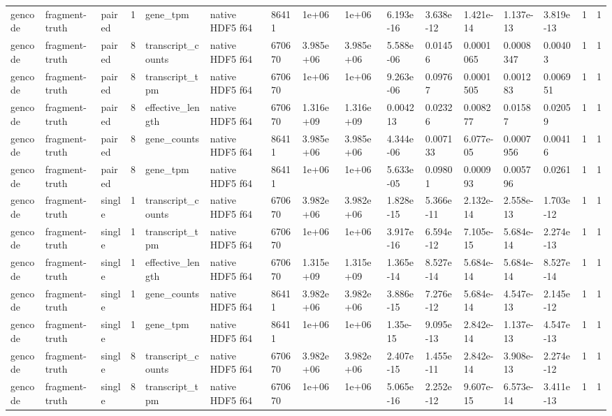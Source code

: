 \begin{tabular}{llllllllllllllll}
gencode & fragment-truth & paired & 1 & gene\_tpm & native HDF5 f64 & 86411 & 1e+06 & 1e+06 & 6.193e-16 & 3.638e-12 & 1.421e-14 & 1.137e-13 & 3.819e-13 & 1 & 1 \\
gencode & fragment-truth & paired & 8 & transcript\_counts & native HDF5 f64 & 670670 & 3.985e+06 & 3.985e+06 & 5.588e-06 & 0.01456 & 0.0001065 & 0.0008347 & 0.00403 & 1 & 1 \\
gencode & fragment-truth & paired & 8 & transcript\_tpm & native HDF5 f64 & 670670 & 1e+06 & 1e+06 & 9.263e-06 & 0.09767 & 0.0001505 & 0.001283 & 0.006951 & 1 & 1 \\
gencode & fragment-truth & paired & 8 & effective\_length & native HDF5 f64 & 670670 & 1.316e+09 & 1.316e+09 & 0.004213 & 0.02326 & 0.008277 & 0.01587 & 0.02059 & 1 & 1 \\
gencode & fragment-truth & paired & 8 & gene\_counts & native HDF5 f64 & 86411 & 3.985e+06 & 3.985e+06 & 4.344e-06 & 0.007133 & 6.077e-05 & 0.0007956 & 0.00416 & 1 & 1 \\
gencode & fragment-truth & paired & 8 & gene\_tpm & native HDF5 f64 & 86411 & 1e+06 & 1e+06 & 5.633e-05 & 0.09801 & 0.000993 & 0.005796 & 0.0261 & 1 & 1 \\
gencode & fragment-truth & single & 1 & transcript\_counts & native HDF5 f64 & 670670 & 3.982e+06 & 3.982e+06 & 1.828e-15 & 5.366e-11 & 2.132e-14 & 2.558e-13 & 1.703e-12 & 1 & 1 \\
gencode & fragment-truth & single & 1 & transcript\_tpm & native HDF5 f64 & 670670 & 1e+06 & 1e+06 & 3.917e-16 & 6.594e-12 & 7.105e-15 & 5.684e-14 & 2.274e-13 & 1 & 1 \\
gencode & fragment-truth & single & 1 & effective\_length & native HDF5 f64 & 670670 & 1.315e+09 & 1.315e+09 & 1.365e-14 & 8.527e-14 & 5.684e-14 & 5.684e-14 & 8.527e-14 & 1 & 1 \\
gencode & fragment-truth & single & 1 & gene\_counts & native HDF5 f64 & 86411 & 3.982e+06 & 3.982e+06 & 3.886e-15 & 7.276e-12 & 5.684e-14 & 4.547e-13 & 2.145e-12 & 1 & 1 \\
gencode & fragment-truth & single & 1 & gene\_tpm & native HDF5 f64 & 86411 & 1e+06 & 1e+06 & 1.35e-15 & 9.095e-13 & 2.842e-14 & 1.137e-13 & 4.547e-13 & 1 & 1 \\
gencode & fragment-truth & single & 8 & transcript\_counts & native HDF5 f64 & 670670 & 3.982e+06 & 3.982e+06 & 2.407e-15 & 1.455e-11 & 2.842e-14 & 3.908e-13 & 2.274e-12 & 1 & 1 \\
gencode & fragment-truth & single & 8 & transcript\_tpm & native HDF5 f64 & 670670 & 1e+06 & 1e+06 & 5.065e-16 & 2.252e-12 & 9.607e-15 & 6.573e-14 & 3.411e-13 & 1 & 1 \\

\end{tabular}
